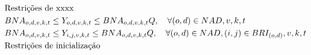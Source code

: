 \begin{align}
	 & \text{Restrições de xxxx}  \notag                                                                                                                                                                                                                  \\
	& BNA_{o,d,v,k,t} \leq Y_{o,d,v,k,t} \leq BNA_{o,d,v,k,t} Q, \quad  \forall (o,d)\in NAD, v, k, t                                                                                                               \label{eq: m1_activ_bin_autho}             \\
	& BNA_{o,d,v,k,t} \leq Y_{i,j,v,k,t} \leq BNA_{o,d,v,k,t} Q, \quad  \forall (o,d)\in NAD, (i,j) \in BRI_{(o,d)}, v,k,t                                                                                                               \label{eq: m1_autho_igualar_trecho_maior}             \\
	 & \text{Restrições de inicialização}  \notag                                                                                                                                                                                                                \\

\end{align}
